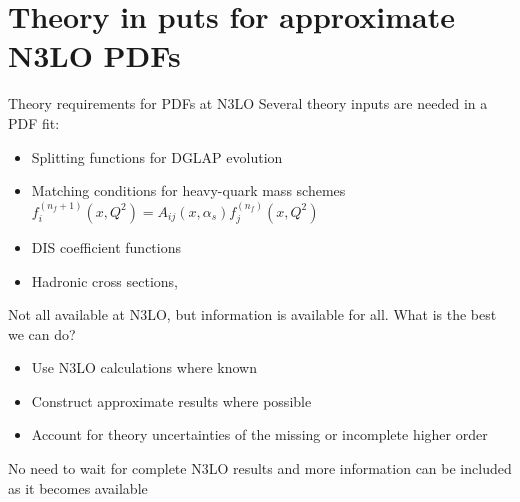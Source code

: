 \documentclass[aspectratio=169, 9pt,t]{beamer}
\begin{document}
\section{Theory in puts for approximate N3LO PDFs}

\begin{frame}{Theory requirements for PDFs at N3LO}
  Several theory inputs are needed in a PDF fit:
  \begin{itemize}
    \item Splitting functions for DGLAP evolution \\

    \item Matching conditions for heavy-quark mass schemes \\
    $ f_i^{\left(n_f+1\right)}\left(x, Q^2\right)=A_{i j}\left(x, \alpha_s\right) f_j^{\left(n_f\right)}\left(x, Q^2\right) $
    \item DIS coefficient functions
    \item Hadronic cross sections,
  \end{itemize}

  \vspace*{1em}
  Not all available at N3LO, but information is available for all. What is the best we can do?
  \begin{itemize}
    \item Use N3LO calculations where known
    \item Construct approximate results where possible
    \item Account for theory uncertainties of the missing or incomplete higher order
  \end{itemize}

  \vspace*{0.5em}
  No need to wait for complete N3LO results and more information can be included as it becomes available
\end{frame}
\end{document}

